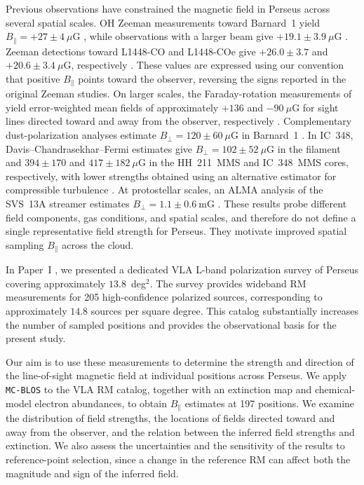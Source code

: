 \documentclass[twocolumn]{aastex701}
\begin{document}
Previous observations have constrained the magnetic field in Perseus
across several spatial scales. OH Zeeman measurements toward Barnard~1
yield $B_\parallel=+27\pm4~\mu\mathrm{G}$
\citep{goodman1989measurement}, while observations with a larger beam give
$+19.1\pm3.9~\mu\mathrm{G}$ \citep{crutcher1993oh}.
Zeeman detections toward L1448-CO and L1448-COe give
$+26.0\pm3.7$ and $+20.6\pm3.4~\mu\mathrm{G}$, respectively
\citep{troland2008magnetic}. These values are expressed using our convention
that positive $B_\parallel$ points toward the observer, reversing
the signs reported in the original Zeeman studies.
On larger scales, the Faraday-rotation measurements of
\citet{tahani2018} yield error-weighted mean fields of approximately
$+136$ and $-90~\mu\mathrm{G}$ for sight lines directed toward and
away from the observer, respectively \citep{tahani2022b}.
Complementary dust-polarization analyses estimate
$B_\perp=120\pm60~\mu\mathrm{G}$ in Barnard~1
\citep{coude2019jcmt}. In IC~348, Davis--Chandrasekhar--Fermi estimates
give $B_\perp=102\pm52~\mu\mathrm{G}$ in the filament and
$394\pm170$ and $417\pm182~\mu\mathrm{G}$ in the HH~211~MMS
and IC~348~MMS cores, respectively, with lower strengths obtained
using an alternative estimator for compressible turbulence
\citep{choi2024jcmt}. At protostellar scales, an ALMA analysis
of the SVS~13A streamer estimates
$B_\perp=1.1\pm0.6~\mathrm{mG}$ \citep{cortes2025first}.
These results probe different field components, gas conditions,
and spatial scales, and therefore do not define a single
representative field strength for Perseus. They motivate improved
spatial sampling $B_\parallel$ across the cloud.

In Paper~I \citep{hajizadeh2026comprehensive}, we presented a dedicated VLA L-band polarization survey of Perseus covering approximately $13.8$~deg$^2$. The survey provides wideband RM measurements for 205 high-confidence polarized sources, corresponding to approximately $14.8$ sources per square degree. This catalog substantially increases the number of sampled positions and provides the observational basis for the present study.

Our aim is to use these measurements to determine the strength and direction of the line-of-sight magnetic field at individual positions across Perseus. We apply \texttt{MC-BLOS} to the VLA RM catalog, together with an extinction map and chemical-model electron abundances, to obtain $B_\parallel$ estimates at 197 positions. We examine the distribution of field strengths, the locations of fields directed toward and away from the observer, and the relation between the inferred field strengths and extinction. We also assess the uncertainties and the sensitivity of the results to reference-point selection, since a change in the reference RM can affect both the magnitude and sign of the inferred field.
\end{document}
